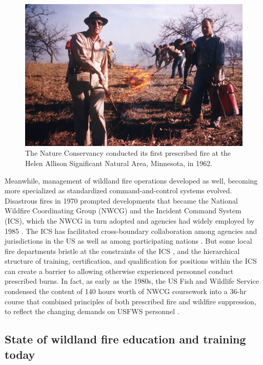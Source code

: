 \documentclass[fire,article,submit,moreauthors,pdftex]{Definitions/mdpi}
\begin{document}
\begin{figure}
\centering
\includegraphics[width=1\columnwidth]{TNC_fire.jpg}
\caption{The Nature Conservancy conducted its first prescribed fire at the Helen Allison Significant Natural Area, Minnesota, in 1962. \label{TNCfire}}
\end{figure}

Meanwhile, management of wildland fire operations developed as well, becoming more specialized as standardized command-and-control systems evolved.
Disastrous fires in 1970 prompted developments that became the National Wildfire Coordinating Group (NWCG) and the Incident Command System (ICS), which the NWCG in turn adopted and agencies had widely employed by 1985 \citep{dague2015, wilson1978}.
The ICS has facilitated cross-boundary collaboration among agencies and jurisdictions in the US as well as among participating nations \citep{goldammer2004}.
But some local fire departments bristle at the constraints of the ICS \citep{jensen2011}, and the hierarchical structure of training, certification, and qualification for positions within the ICS can create a barrier to allowing otherwise experienced personnel conduct prescribed burns.
In fact, as early as the 1980s, the US Fish and Wildlife Service condensed the content of 140 hours worth of NWCG coursework into a 36-hr course that combined principles of both prescribed fire and wildfire suppression, to reflect the changing demands on USFWS personnel \citep{murphy1987}.

\hypertarget{state-of-wildland-fire-education-and-training-today}{%
\subsection{State of wildland fire education and training today}\label{state-of-wildland-fire-education-and-training-today}}
\end{document}
